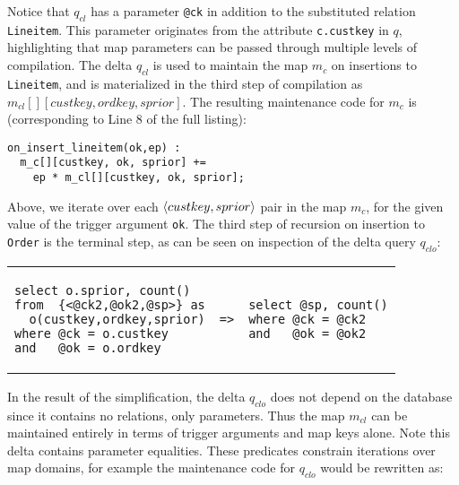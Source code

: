 \vspace{1mm}
Notice that $q_{cl}$ has a parameter {\tt @ck} in addition to the substituted
relation {\tt Lineitem}. This parameter originates from the attribute
{\tt c.custkey} in $q$, highlighting that map parameters can be passed
through multiple levels of compilation.
The delta $q_{cl}$ is used to maintain the map $m_c$ on
insertions to {\tt Lineitem}, and is materialized in the third step of
compilation as $m_{cl}[][custkey,ordkey,sprior]$. The resulting maintenance code
for $m_{c}$ is (corresponding to Line 8 of the full listing):

{\footnotesize
\begin{verbatim}
on_insert_lineitem(ok,ep) :
  m_c[][custkey, ok, sprior] +=
    ep * m_cl[][custkey, ok, sprior];
\end{verbatim}
}

Above, we iterate over each ${\langle custkey,sprior\rangle}$ pair in the map $m_c$, for
the given value of the trigger argument {\tt ok}. 
The third step of recursion on insertion to {\tt Order} is the terminal step, as
can be seen on inspection of the delta query $q_{clo}$:

\vspace{1mm}
\hspace{-5mm}
\begin{tabular}{lcl}
\begin{minipage}{1.68in}
\begin{verbatim}
select o.sprior, count()
from  {<@ck2,@ok2,@sp>} as
  o(custkey,ordkey,sprior)
where @ck = o.custkey
and   @ok = o.ordkey
\end{verbatim}
\end{minipage}
&
{\tt =>}
&
\hspace{-3mm}
\begin{minipage}{1.3in}
\begin{verbatim}
select @sp, count()
where @ck = @ck2
and   @ok = @ok2
\end{verbatim}
\end{minipage}
\end{tabular}

\vspace{1mm}
In the result of the simplification, the delta $q_{clo}$ does not depend on the
database since it contains no relations, only parameters. Thus the map $m_{cl}$
can be maintained entirely in terms of trigger arguments and map keys alone.
Note this delta contains parameter equalities. These predicates constrain
iterations over map domains, for example the maintenance code for $q_{clo}$
would be rewritten as:

